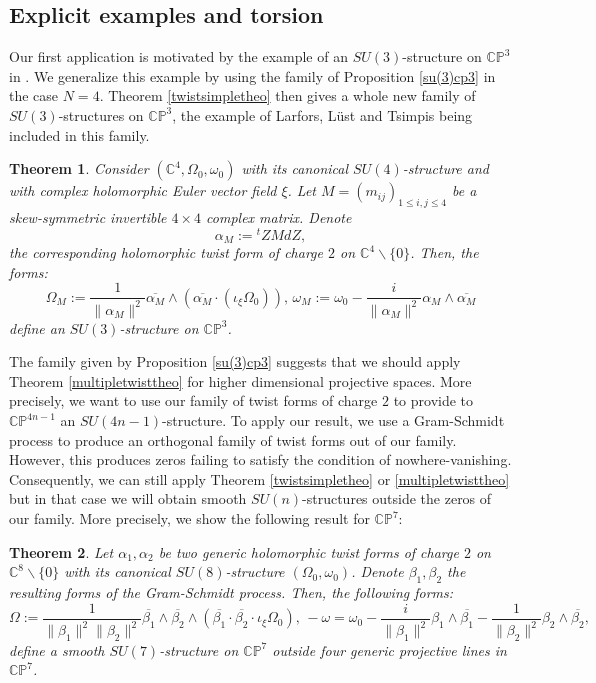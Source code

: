 \documentclass[12pt, reqno]{amsart}
\newtheorem{introthm}{Theorem}
\newcommand{\C}{\mathbb{C}}
\newcommand{\p}{\mathbb{P}}
\begin{document}
\subsection{Explicit examples and torsion}
Our first application is motivated by the example of an $SU(3)$-structure on $\C\p^3$ in \cite{Larfors_2013,Larfors_2010}. We generalize this example by using the family of Proposition \ref{su(3)cp3} in the case $N=4$. Theorem \ref{twistsimpletheo} then gives a whole new family of $SU(3)$-structures on $\C\p^3$, the example of Larfors, Lüst and Tsimpis being included in this family.
\begin{introthm}\label{cp3}
     Consider $(\C^4,\Omega_0,\omega_0)$ with its canonical $SU(4)$-structure and with complex holomorphic Euler vector field $\xi$. Let $M=(m_{ij})_{1\leq i,j\leq 4}$ be a skew-symmetric invertible $4\times 4$ complex matrix. Denote \[\alpha_M:={}^tZMdZ,\] the corresponding holomorphic twist form of charge $2$ on $\C^{4}\backslash\{0\}$. Then, the forms: \[\Omega_M:=\frac{1}{\|\alpha_M\|^2}\overline{\alpha_M}\wedge(\overline{\alpha_M}\cdot(\iota_\xi\Omega_0)),\, \omega_M:=\omega_0-\frac{i}{\|\alpha_M\|^2}\alpha_M\wedge\overline{\alpha_M}\] define an $SU(3)$-structure on $\C\p^3$.
\end{introthm}
\indent The family given by Proposition \ref{su(3)cp3} suggests that we should apply Theorem \ref{multipletwisttheo} for higher dimensional projective spaces. More precisely, we want to use our family of twist forms of charge $2$ to provide to $\C\p^{4n-1}$ an $SU(4n-1)$-structure. To apply our result, we use a Gram-Schmidt process to produce an orthogonal family of twist forms out of our family. However, this produces zeros failing to satisfy the condition of nowhere-vanishing. Consequently, we can still apply Theorem \ref{twistsimpletheo} or \ref{multipletwisttheo} but in that case we will obtain smooth $SU(n)$-structures outside the zeros of our family. More precisely, we show the following result for $\C\p^7$:
\begin{introthm}\label{cp7}
    Let $\alpha_1,\alpha_2$ be two generic holomorphic twist forms of charge $2$ on $\C^8\backslash\{0\}$ with its canonical $SU(8)$-structure $(\Omega_0,\omega_0)$. Denote $\beta_1,\beta_2$ the resulting forms of the Gram-Schmidt process. Then, the following forms:
    \[\Omega:=\frac{1}{\|\beta_1\|^2\|\beta_2\|^2}\overline{\beta_1}\wedge\overline{\beta_2}\wedge(\overline{\beta_1}\cdot\overline{\beta_2}\cdot\iota_\xi\Omega_0),\,-\omega=\omega_0-\frac{i}{\|\beta_1\|^2}\beta_1\wedge\overline{\beta_1}-\frac{1}{\|\beta_2\|^2}\beta_2\wedge\overline{\beta_2},\] define a smooth $SU(7)$-structure on $\C\p^7$ outside four generic projective lines in $\C\p^7$. 
\end{introthm}
\end{document}
